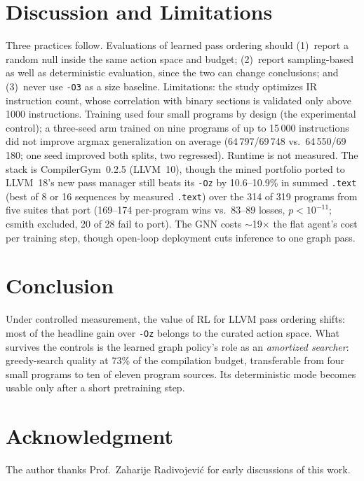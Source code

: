 \documentclass[conference,a4paper]{IEEEtran}
\begin{document}
\section{Discussion and Limitations}
Three practices follow. Evaluations of learned pass ordering should
(1)~report a random null inside the same action space and budget;
(2)~report sampling-based as well as deterministic evaluation, since
the two can change conclusions; and (3)~never use \texttt{-O3} as a
size baseline. Limitations: the study optimizes IR instruction count,
whose correlation with binary sections is validated only above 1000
instructions. Training used four small programs by design (the
experimental control); a three-seed arm trained on nine programs of up
to 15\,000 instructions did not improve argmax generalization on
average (64\,797/69\,748 vs.\ 64\,550/69\,180; one seed improved both
splits, two regressed). Runtime is not measured. The stack is
CompilerGym~0.2.5 (LLVM~10), though the mined portfolio ported to
LLVM~18's new pass manager still beats its \texttt{-Oz} by
10.6--10.9\% in summed \texttt{.text} (best of 8 or 16 sequences by
measured \texttt{.text}) over the 314 of 319 programs from five suites
that port (169--174 per-program wins vs.\ 83--89 losses,
$p{<}10^{-11}$; csmith excluded, 20 of 28 fail to port). The GNN costs $\sim$19$\times$
the flat agent's cost per training step, though open-loop deployment
cuts inference to one graph pass.

\section{Conclusion}
Under controlled measurement, the value of RL for LLVM pass ordering
shifts: most of the headline gain over \texttt{-Oz} belongs to the
curated action space. What survives the controls is the learned graph
policy's role as an \emph{amortized searcher}: greedy-search quality at
73\% of the compilation budget, transferable from four small programs
to ten of eleven program sources. Its deterministic mode becomes usable
only after a short pretraining step.

\section*{Acknowledgment}
The author thanks Prof.~Zaharije Radivojevi\'c for early discussions of this
work.



\end{document}
